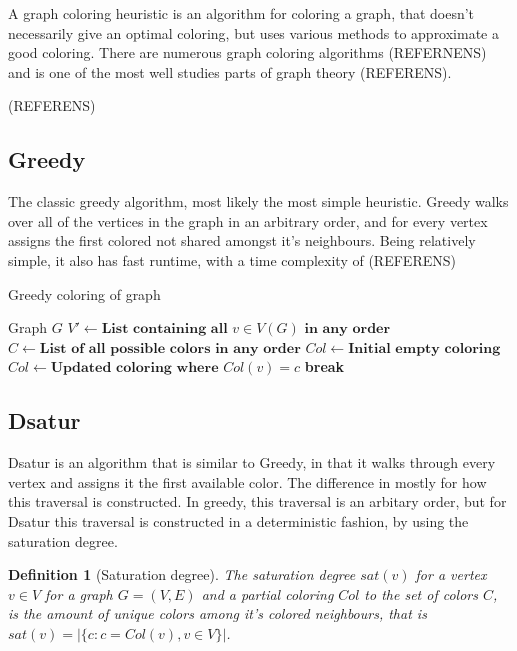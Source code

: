 \documentclass{amsart}
\newtheorem{definition}{Definition}[section]
\newcommand{\algorithmicbreak}{\textbf{break}}
\newcommand{\BREAK}{\STATE \algorithmicbreak}
\begin{document}
A graph coloring heuristic is an algorithm for coloring a graph, that doesn't
necessarily give an optimal coloring, but uses various methods to approximate a
good coloring. There are numerous graph coloring algorithms (REFERNENS) and is
one of the most well studies parts of graph theory (REFERENS). 

(REFERENS)
\subsection{Greedy}
\label{alg:greedy}
The classic greedy algorithm, most likely the most simple heuristic. Greedy
walks over all of the vertices in the graph in an arbitrary order, and for every
vertex assigns the first colored not shared amongst it's neighbours. Being
relatively simple, it also has fast runtime, with a time complexity 
of (REFERENS)

\begin{algorithm}[H]
  \caption{Greedy coloring of graph}
  \label{alg:modmin}
  \begin{algorithmic}[1]
    \REQUIRE Graph $G$
      \STATE $V' \leftarrow \textbf{List containing all $v \in V(G)$ in any order}$
      \STATE $C \leftarrow \textbf{List of all possible colors in any order}$
      \STATE $Col \leftarrow \textbf{Initial empty coloring}$
                \STATE $Col \leftarrow \textbf{Updated coloring where $Col(v) =
                c$}$
                \BREAK
            \ENDIF
        \ENDFOR
    \ENDFOR
  \end{algorithmic}
\end{algorithm}
\subsection{Dsatur}

Dsatur is an algorithm that is similar to Greedy, in that it walks through every
vertex and assigns it the first available color. The difference in mostly for
how this traversal is constructed. In greedy, this traversal is an arbitary
order, but for Dsatur this traversal is constructed in a deterministic fashion,
by using the saturation degree.

\begin{definition}[Saturation degree]
    The saturation degree $sat(v)$ for a vertex $v \in V$ for a graph $G =
    (V,E)$ and a partial coloring $Col$ to the set of colors $C$, is the amount of unique colors among
    it's colored neighbours, that is $sat(v) = |\{c  : c = Col(v), v \in V \}|$.
\end{definition}
\end{document}
